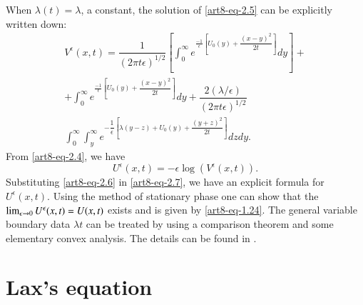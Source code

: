 When $\lambda(t)= \lambda$, a constant, the solution of \eqref{art8-eq-2.5} can be explicitly written down:
\begin{equation}\label{art8-eq-2.6}
\begin{split}
V^{\epsilon}(x,t) = \dfrac{1}{(2\pi t \epsilon )^{1/2}}\left[\int_{0}^{\infty} e^{\tfrac{-1}{\epsilon}\left[U_{0}(y)+ \dfrac{(x-y)^{2}}{2t}\right]}dy\right] +\\
+ \int_{0}^{\infty}e^{\tfrac{-1}{\epsilon}\left[U_{0}(y)+ \dfrac{(x-y)^{2}}{2t}\right]}dy +
\dfrac{2(\lambda/\epsilon)}{(2\pi t\epsilon)^{1/2}}\\ \int_{0}^{\infty} \int_{y}^{\infty} e^{-\dfrac{1}{\epsilon}\left[\lambda(y-z)+U_{0}(y) +\dfrac{(y+z)^{2}}{2t}\right]}dzdy.
\end{split}
\end{equation}
From \eqref{art8-eq-2.4}, we have
\begin{equation}\label{art8-eq-2.7}
U^{\epsilon}(x, t)= -\epsilon\log(V^{\epsilon}(x, t)).
\end{equation}
Substituting \eqref{art8-eq-2.6} in \eqref{art8-eq-2.7}, we have an explicit formula for $U^{\epsilon}(x,t)$. Using the method of stationary phase one can show that the $\lim_{\epsilon \rightarrow 0}U^{\epsilon}\break (x, t)=U(x,t)$ exists and is given by \eqref{art8-eq-1.24}. The general variable boundary data $\lambda{t}$ can be treated by using a comparison theorem and some elementary convex analysis. The details can be found in \cite{art8-key3}.

\section{Lax's equation}\label{art8-sec-3}

